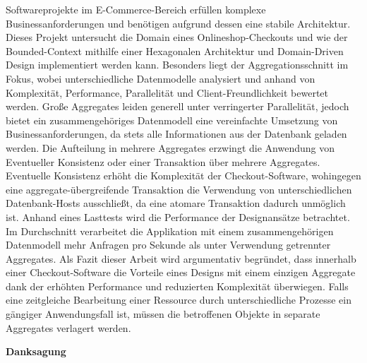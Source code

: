 {{		Softwareprojekte im E-Commerce-Bereich erfüllen komplexe Businessanforderungen und benötigen aufgrund dessen eine stabile Architektur. Dieses Projekt untersucht die Domain eines Onlineshop-Checkouts und wie der Bounded-Context mithilfe einer Hexagonalen Architektur und Domain-Driven Design implementiert werden kann. Besonders liegt der Aggregationsschnitt im Fokus, wobei unterschiedliche Datenmodelle analysiert und anhand von Komplexität, Performance, Parallelität und Client-Freundlichkeit bewertet werden. Große Aggregates leiden generell unter verringerter Parallelität, jedoch bietet ein zusammengehöriges Datenmodell eine vereinfachte Umsetzung von Businessanforderungen, da stets alle Informationen aus der Datenbank geladen werden. Die Aufteilung in mehrere Aggregates erzwingt die Anwendung von Eventueller Konsistenz oder einer Transaktion über mehrere Aggregates. Eventuelle Konsistenz erhöht die Komplexität der Checkout-Software, wohingegen eine aggregate-übergreifende Transaktion die Verwendung von unterschiedlichen Datenbank-Hosts  ausschließt, da eine atomare Transaktion dadurch unmöglich ist. Anhand eines Lasttests wird die Performance der Designansätze betrachtet. Im Durchschnitt verarbeitet die Applikation mit einem zusammengehörigen Datenmodell mehr Anfragen pro Sekunde als unter Verwendung getrennter Aggregates. Als Fazit dieser Arbeit wird argumentativ begründet, dass innerhalb einer Checkout-Software die Vorteile eines Designs mit einem einzigen Aggregate dank der erhöhten Performance und reduzierten Komplexität überwiegen. Falls eine zeitgleiche Bearbeitung einer Ressource durch unterschiedliche Prozesse ein gängiger Anwendungsfall ist, müssen die betroffenen Objekte in separate Aggregates verlagert werden.
		  
	\par}
	\pagebreak

	\vspace{0.9cm}
	\large
	\textbf{Danksagung}
	
	\pagebreak
	
\par}